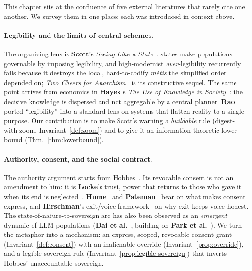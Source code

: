 \documentclass[11pt,a4paper]{article}
\theoremstyle{definition}
\theoremstyle{plain}
\begin{document}
This chapter sits at the confluence of five external literatures that rarely cite one
another. We survey them in one place; each was introduced in context above.

\paragraph{Legibility and the limits of central schemes.}
The organizing lens is \textbf{Scott}'s \emph{Seeing Like a State}~:
states make populations governable by imposing legibility, and high-modernist
\emph{over}-legibility recurrently fails because it destroys the local, hard-to-codify
\emph{m\^etis} the simplified order depended on; \emph{Two Cheers for
Anarchism}~ is its constructive sequel. The same point arrives from
economics in \textbf{Hayek}'s \emph{The Use of Knowledge in Society}~:
the decisive knowledge is dispersed and not aggregable by a central planner.
\textbf{Rao}~ ported ``legibility'' into a standard lens on systems that
flatten reality to a single purpose. Our contribution is to make Scott's warning a
\emph{buildable} rule (digest-with-zoom, Invariant~\ref{def:zoom}) and to give it an
information-theoretic lower bound (Thm.~\ref{thm:lowerbound}).

\paragraph{Authority, consent, and the social contract.}
The authority argument starts from Hobbes~. Its
revocable consent is not an amendment to him: it is \textbf{Locke}'s trust, power
that returns to those who gave it when its end is neglected~.
\textbf{Hume}~ and \textbf{Pateman}~ bear on
what makes consent express, and \textbf{Hirschman}'s exit/voice
framework~ on why exit keeps voice honest. The
state-of-nature-to-sovereign arc has also been observed as an \emph{emergent} dynamic of
LLM populations (\textbf{Dai et al.}~, building on \textbf{Park et
al.}~). We turn the metaphor into a mechanism: an express, scoped,
revocable consent grant (Invariant~\ref{def:consent}) with an inalienable override
(Invariant~\ref{prop:override}), and a legible-sovereign rule
(Invariant~\ref{prop:legible-sovereign}) that inverts Hobbes' unaccountable sovereign.

\pdmarginpagebreak
\end{document}
